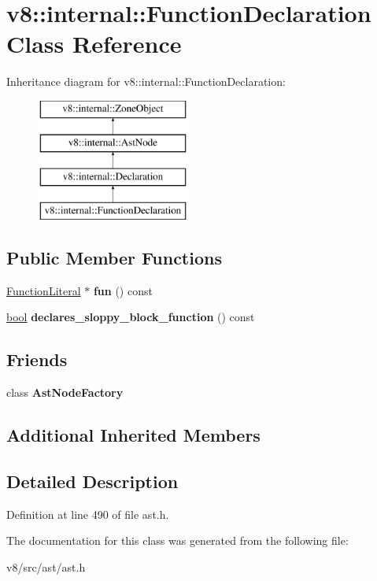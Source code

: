 \hypertarget{classv8_1_1internal_1_1FunctionDeclaration}{}\section{v8\+:\+:internal\+:\+:Function\+Declaration Class Reference}
\label{classv8_1_1internal_1_1FunctionDeclaration}
Inheritance diagram for v8\+:\+:internal\+:\+:Function\+Declaration\+:\begin{figure}[H]
\begin{center}
\leavevmode
\includegraphics[height=4.000000cm]{classv8_1_1internal_1_1FunctionDeclaration}
\end{center}
\end{figure}
\subsection*{Public Member Functions}
\begin{DoxyCompactItemize}
\item 
\mbox{\label{classv8_1_1internal_1_1FunctionDeclaration_a2f7354ba87a4ed23d704f76b210edabe}} 
\mbox{\hyperlink{classv8_1_1internal_1_1FunctionLiteral}{Function\+Literal}} $\ast$ {\bfseries fun} () const
\item 
\mbox{\label{classv8_1_1internal_1_1FunctionDeclaration_aa26f53b7587f581bd17bed825f11020c}} 
\mbox{\hyperlink{classbool}{bool}} {\bfseries declares\+\_\+sloppy\+\_\+block\+\_\+function} () const
\end{DoxyCompactItemize}
\subsection*{Friends}
\begin{DoxyCompactItemize}
\item 
\mbox{\label{classv8_1_1internal_1_1FunctionDeclaration_a8d587c8ad3515ff6433eb83c578e795f}} 
class {\bfseries Ast\+Node\+Factory}
\end{DoxyCompactItemize}
\subsection*{Additional Inherited Members}


\subsection{Detailed Description}


Definition at line 490 of file ast.\+h.



The documentation for this class was generated from the following file\+:\begin{DoxyCompactItemize}
\item 
v8/src/ast/ast.\+h\end{DoxyCompactItemize}
